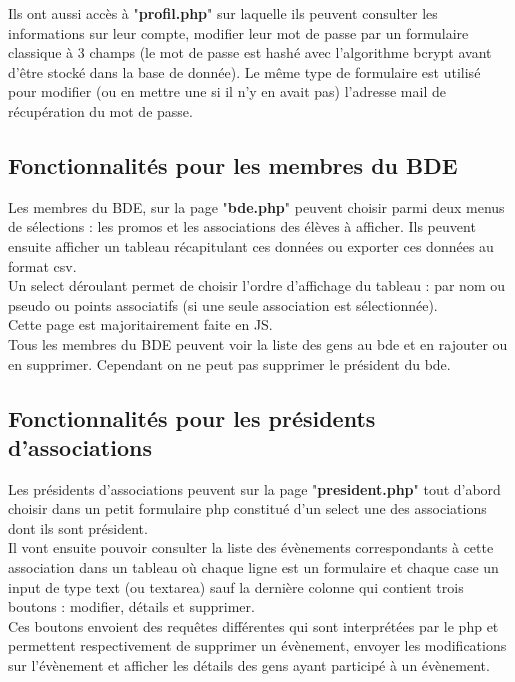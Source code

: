 \documentclass[french]{article}
\begin{document}
	Ils ont aussi accès à "\textbf{profil.php}" sur laquelle ils peuvent consulter les informations sur leur compte, modifier leur mot de passe par un formulaire classique à 3 champs (le mot de passe est hashé avec l'algorithme bcrypt avant d'être stocké dans la base de donnée). Le même type de formulaire est utilisé pour modifier (ou en mettre une si il n'y en avait pas) l'adresse mail de récupération du mot de passe.
	
\subsection{Fonctionnalités pour les membres du BDE}
	Les membres du BDE, sur la page "\textbf{bde.php}" peuvent choisir parmi deux menus de sélections : les promos et les associations des élèves à afficher. Ils peuvent ensuite afficher un tableau récapitulant ces données ou exporter ces données au format csv.\\ Un select déroulant permet de choisir l'ordre d'affichage du tableau : par nom ou pseudo ou points associatifs (si une seule association est sélectionnée).\\
	
	Cette page est majoritairement faite en JS. \\
	
	Tous les membres du BDE peuvent voir la liste des gens au bde et en rajouter ou en supprimer. Cependant on ne peut pas supprimer le président du bde. 

\subsection{Fonctionnalités pour les présidents d'associations}	
	Les présidents d'associations peuvent sur la page "\textbf{president.php}" tout d'abord choisir dans un petit formulaire php constitué d'un select une des associations dont ils sont président.\\
	
	Il vont ensuite pouvoir consulter la liste des évènements correspondants à cette association dans un tableau où chaque ligne est un formulaire et chaque case un input de type text (ou textarea) sauf la dernière colonne qui contient trois boutons : modifier, détails et supprimer.\\
	
	Ces boutons envoient des requêtes différentes qui sont interprétées par le php et permettent respectivement de supprimer un évènement, envoyer les modifications sur l'évènement et afficher les détails des gens ayant participé à un évènement. \\
	
\end{document}

